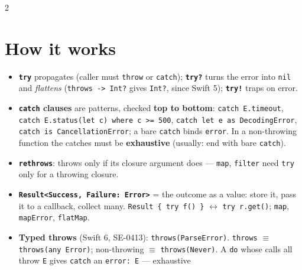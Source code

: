 \documentclass[8pt]{extarticle}
\begin{document}



\begin{multicols}{2}
\raggedright

\section{How it works}
\begin{itemize}
  \item \textbf{\texttt{try}} propagates (caller must \texttt{throw} or
        \texttt{catch}); \textbf{\texttt{try?}} turns the error into
        \texttt{nil} and \emph{flattens} (\texttt{throws -> Int?} gives
        \texttt{Int?}, since Swift 5); \textbf{\texttt{try!}} traps on error.
  \item \textbf{\texttt{catch} clauses} are patterns, checked \textbf{top to
        bottom}: \texttt{catch E.timeout}, \texttt{catch E.status(let c) where c >= 500},
        \texttt{catch let e as DecodingError}, \texttt{catch is CancellationError};
        a bare \texttt{catch} binds \texttt{error}. In a non-throwing function the
        catches must be \textbf{exhaustive} (usually: end with bare \texttt{catch}).
  \item \textbf{\texttt{rethrows}}: throws only if its closure argument does
        — \texttt{map}, \texttt{filter} need \texttt{try} only for a throwing closure.
  \item \textbf{\texttt{Result<Success, Failure: Error>}} = the outcome as a
        value: store it, pass it to a callback, collect many.
        \texttt{Result \{ try f() \}} $\leftrightarrow$ \texttt{try r.get()};
        \texttt{map}, \texttt{mapError}, \texttt{flatMap}.
  \item \textbf{Typed throws} (Swift 6, SE-0413): \texttt{throws(ParseError)}.
        \texttt{throws} $\equiv$ \texttt{throws(any Error)}; non-throwing
        $\equiv$ \texttt{throws(Never)}. A \texttt{do} whose calls all throw
        \texttt{E} gives \texttt{catch} an \texttt{error: E} — exhaustive

\end{itemize}
\end{multicols}
\end{document}
